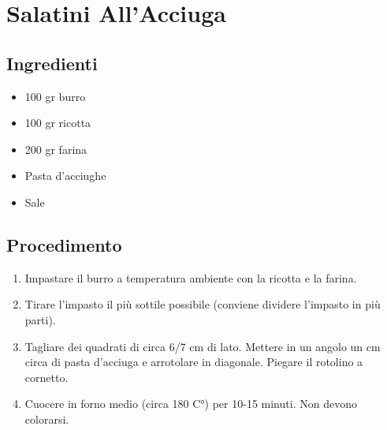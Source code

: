\section{Salatini All'Acciuga}
\subsection{Ingredienti}
\begin{itemize}
\item 100 gr burro  
\item 100 gr ricotta  
\item 200 gr farina  
\item Pasta d'acciughe  
\item Sale
\end{itemize}
\subsection{Procedimento}
\begin{enumerate}
\item  Impastare il burro a temperatura ambiente con la ricotta e la farina.  
\item  Tirare l'impasto il più sottile possibile (conviene dividere l'impasto in più parti).  
\item  Tagliare dei quadrati di circa 6/7 cm di lato. Mettere in un angolo un cm circa di pasta d'acciuga e arrotolare in diagonale. Piegare il rotolino a cornetto.  
\item  Cuocere in forno medio (circa 180 C°) per 10-15 minuti. Non devono colorarsi.
\end{enumerate}
